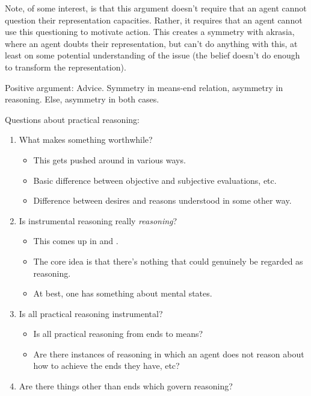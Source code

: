 \documentclass[10pt]{article}
\begin{document}
Note, of some interest, is that this argument doesn't require that an agent cannot question their representation capacities.
Rather, it requires that an agent cannot use this questioning to motivate action.
This creates a symmetry with akrasia, where an agent doubts their representation, but can't do anything with this, at least on some potential understanding of the issue (the belief doesn't do enough to transform the representation).






Positive argument:
Advice.
Symmetry in means-end relation, asymmetry in reasoning.
Else, asymmetry in both cases.


\newpage



Questions about practical reasoning:
\begin{enumerate}
\item What makes something worthwhile?
  \begin{itemize}
  \item This gets pushed around in various ways.
  \item Basic difference between objective and subjective evaluations, etc.
  \item Difference between desires and reasons understood in some other way.
  \end{itemize}
\item Is instrumental reasoning really \emph{reasoning}?
  \begin{itemize}
  \item This comes up in \citeauthor{Hume:2011aa} and \citeauthor{Smith:2004aa}.
  \item The core idea is that there's nothing that could genuinely be regarded as reasoning.
  \item At best, one has something about mental states.
  \end{itemize}
\item Is all practical reasoning instrumental?
  \begin{itemize}
  \item Is all practical reasoning from ends to means?
  \item Are there instances of reasoning in which an agent does not reason about how to achieve the ends they have, etc?
  \end{itemize}
\item Are there things other than ends which govern reasoning?
  \begin{itemize}

\end{itemize}
\end{enumerate}
\end{document}
